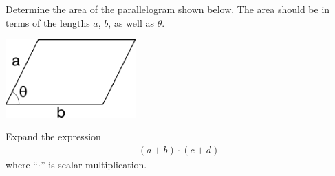\begin{problem}
\item Determine the area of the parallelogram shown below. The area
  should be in terms of the lengths $a$, $b$, as well as $\theta$.

  \includegraphics[width=5cm]{../semI/ink/week11/parallelogram}

  \vfill

\item Expand the expression
  \begin{eqnarray*}
    \left( a + b \right) \cdot \left( c + d \right)
  \end{eqnarray*}
  where ``$\cdot$'' is scalar multiplication.

  \vfill

\end{problem}


